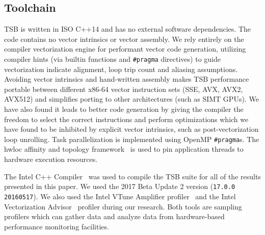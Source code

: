 \documentclass{sig-alternate-05-2015}
\begin{document}
%

\subsection{Toolchain}
\label{sec:experimental_setup:toolchain}

TSB is written in ISO C++14 and has no external software dependencies.
The code contains no vector intrinsics or vector assembly.
We rely entirely on the compiler vectorization engine for performant vector code
  generation, utilizing compiler hints (via builtin functions and
  \lstinline{#pragma} directives) to guide vectorization indicate alignment, loop
  trip count and aliasing assumptions.
Avoiding vector intrinsics and hand-written assembly makes TSB performance
  portable between different x86-64 vector instruction sets (SSE, AVX, AVX2,
  AVX512) and simplifies porting to other architectures (such as SIMT GPUs).
We have also found it leads to better code generation by giving the compiler
  the freedom to select the correct instructions and perform optimizations which
  we have found to be inhibited by explicit vector intrinsics, such as
  post-vectorization loop unrolling.
Task parallelization is implemented using OpenMP \lstinline{#pragma}s.
The hwloc affinity and topology framework~\cite{hwloc} is used to pin
  application threads to hardware execution resources.

The Intel C++ Compiler~\cite{intel_cpp_compiler} was used to compile the TSB
  suite for all of the results presented in this paper.
We used the 2017 Beta Update 2 version (\lstinline{17.0.0 20160517}).
We also used the Intel VTune Amplifier profiler~\cite{intel_vtune_amplifier}
  and the Intel Vectorization Advisor~\cite{intel_vectorization_advisor} profiler
  during our research.
Both tools are sampling profilers which can gather data and analyze data from
  hardware-based performance monitoring facilities.
\end{document}
